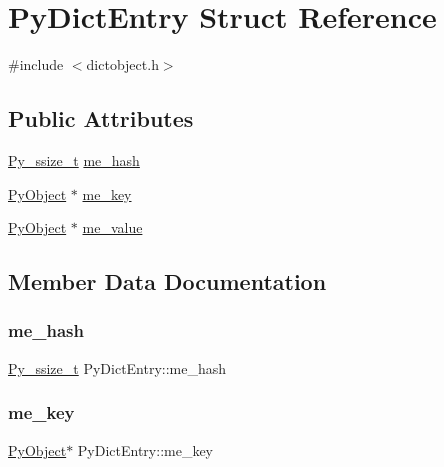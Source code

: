 \hypertarget{struct_py_dict_entry}{}\section{Py\+Dict\+Entry Struct Reference}
\label{struct_py_dict_entry}


{\ttfamily \#include $<$dictobject.\+h$>$}

\subsection*{Public Attributes}
\begin{DoxyCompactItemize}
\item 
\mbox{\hyperlink{pyport_8h_ac6411a3dfda9ac6feb9e8d859b1184bc}{Py\+\_\+ssize\+\_\+t}} \mbox{\hyperlink{struct_py_dict_entry_ac936683135b50ef3a16f191ed97954e6}{me\+\_\+hash}}
\item 
\mbox{\hyperlink{_python27_2object_8h_aadc84ac7aed2cfa6f20c25f62bf3dac7}{Py\+Object}} $\ast$ \mbox{\hyperlink{struct_py_dict_entry_a5071480b21afb4c642c4ac7fb583b9ae}{me\+\_\+key}}
\item 
\mbox{\hyperlink{_python27_2object_8h_aadc84ac7aed2cfa6f20c25f62bf3dac7}{Py\+Object}} $\ast$ \mbox{\hyperlink{struct_py_dict_entry_a89a5e540de9a2d06cf3f25ae87f82009}{me\+\_\+value}}
\end{DoxyCompactItemize}


\subsection{Member Data Documentation}
\mbox{\label{struct_py_dict_entry_ac936683135b50ef3a16f191ed97954e6}} 
\subsubsection{\texorpdfstring{me\_hash}{me\_hash}}
{\footnotesize\ttfamily \mbox{\hyperlink{pyport_8h_ac6411a3dfda9ac6feb9e8d859b1184bc}{Py\+\_\+ssize\+\_\+t}} Py\+Dict\+Entry\+::me\+\_\+hash}

\mbox{\label{struct_py_dict_entry_a5071480b21afb4c642c4ac7fb583b9ae}} 
\subsubsection{\texorpdfstring{me\_key}{me\_key}}
{\footnotesize\ttfamily \mbox{\hyperlink{_python27_2object_8h_aadc84ac7aed2cfa6f20c25f62bf3dac7}{Py\+Object}}$\ast$ Py\+Dict\+Entry\+::me\+\_\+key}

